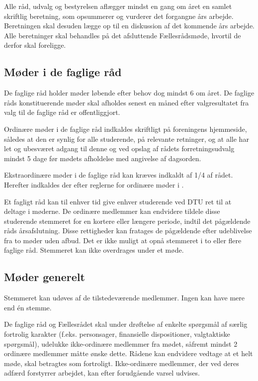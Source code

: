 \begin{list}
\item  Alle råd, udvalg og bestyrelsen aflægger mindst en gang om året en samlet skriftlig beretning, som opsummerer og vurderer det forgangne års arbejde. Beretningen skal desuden lægge op til en diskussion af det kommende års arbejde. Alle beretninger skal behandles på det afsluttende Fællesrådsmøde, hvortil de derfor skal foreligge.


\subsection{Møder i de faglige råd}
\label{S:kap:FagligMoeder}
\item De faglige råd holder møder løbende efter behov dog mindst 6 om året. De faglige råds konstituerende møder skal afholdes senest en måned efter valgresultatet fra valg til de faglige råd er offentliggjort.

\item  \label{S:FagligMoeder:indkaldelse} Ordinære møder i de faglige råd indkaldes skriftligt på foreningens hjemmeside, således at den er synlig for alle studerende, på relevante retninger, og at alle har let og ubesværet adgang til denne og ved opslag af rådets forretningsudvalg mindst 5 dage før mødets afholdelse med angivelse af dagsorden. 

\item  Ekstraordinære møder i de faglige råd kan kræves indkaldt af 1/4 af rådet. Herefter indkaldes der efter reglerne for ordinære møder i .

\item  Et fagligt råd kan til enhver tid give enhver studerende ved DTU ret til at deltage i møderne. De ordinære medlemmer kan endvidere tildele disse studerende stemmeret for en kortere eller længere periode, indtil det pågældende råds årsafslutning. Disse rettigheder kan fratages de pågældende efter udeblivelse fra to møder uden afbud. Det er ikke muligt at opnå stemmeret i to eller flere faglige råd. Stemmeret kan ikke overdrages under et møde.


\subsection{Møder generelt}
\label{S:kap:MoederGenerelt}
\item  Stemmeret kan udøves af de tilstedeværende medlemmer. Ingen kan have mere end én stemme.

\item \label{S:MoederGenerelt:fortrolig} De faglige råd og Fællesrådet skal under drøftelse af enkelte spørgsmål af særlig fortrolig karakter (f.eks. personsager, finansielle dispositioner, valgtaktiske spørgsmål), udelukke ikke-ordinære medlemmer fra mødet, såfremt mindst 2 ordinære medlemmer måtte ønske dette. Rådene kan endvidere vedtage at et helt møde, skal betragtes som fortroligt. Ikke-ordinære medlemmer, der ved deres adfærd forstyrrer arbejdet, kan efter forudgående varsel udvises.


\end{list}
